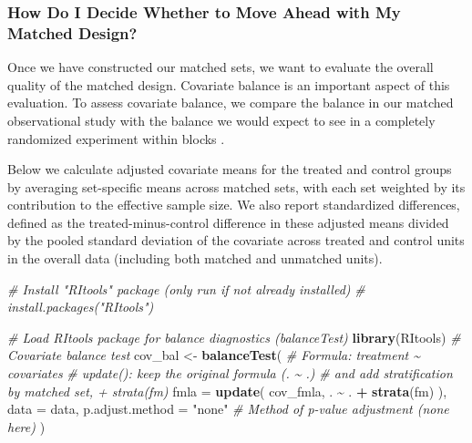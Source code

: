 \documentclass[
  12pt,
  leqno]{article}
\newenvironment{Shaded}{\begin{snugshade}}{\end{snugshade}}
\newcommand{\AttributeTok}[1]{\textcolor[rgb]{0.13,0.29,0.53}{#1}}
\newcommand{\CommentTok}[1]{\textcolor[rgb]{0.56,0.35,0.01}{\textit{#1}}}
\newcommand{\FunctionTok}[1]{\textcolor[rgb]{0.13,0.29,0.53}{\textbf{#1}}}
\newcommand{\NormalTok}[1]{#1}
\newcommand{\OtherTok}[1]{\textcolor[rgb]{0.56,0.35,0.01}{#1}}
\newcommand{\SpecialCharTok}[1]{\textcolor[rgb]{0.81,0.36,0.00}{\textbf{#1}}}
\newcommand{\StringTok}[1]{\textcolor[rgb]{0.31,0.60,0.02}{#1}}
\begin{document}
\subsubsection{How Do I Decide Whether to Move Ahead with My Matched
Design?}\label{how-do-i-decide-whether-to-move-ahead-with-my-matched-design}

Once we have constructed our matched sets, we want to evaluate the
overall quality of the matched design. Covariate balance is an important
aspect of this evaluation. To assess covariate balance, we compare the
balance in our matched observational study with the balance we would
expect to see in a completely randomized experiment within blocks
\citep{hansenbowers2008}.

Below we calculate adjusted covariate means for the treated and control
groups by averaging set-specific means across matched sets, with each
set weighted by its contribution to the effective sample size. We also
report standardized differences, defined as the treated-minus-control
difference in these adjusted means divided by the pooled standard
deviation of the covariate across treated and control units in the
overall data (including both matched and unmatched units).

\singlespacing

\begin{Shaded}
\begin{Highlighting}[]
\CommentTok{\# Install "RItools" package (only run if not already installed)}
\CommentTok{\# install.packages("RItools")}

\CommentTok{\# Load RItools package for balance diagnostics (balanceTest)}
\FunctionTok{library}\NormalTok{(RItools)}
\CommentTok{\# Covariate balance test}
\NormalTok{cov\_bal }\OtherTok{\textless{}{-}} \FunctionTok{balanceTest}\NormalTok{(}
  \CommentTok{\# Formula: treatment \textasciitilde{} covariates}
  \CommentTok{\# update(): keep the original formula (. \textasciitilde{} .)}
  \CommentTok{\# and add stratification by matched set, + strata(fm)}
  \AttributeTok{fmla =} \FunctionTok{update}\NormalTok{(}
\NormalTok{    cov\_fmla, . }\SpecialCharTok{\textasciitilde{}}\NormalTok{ . }\SpecialCharTok{+} \FunctionTok{strata}\NormalTok{(fm)}
\NormalTok{  ),}
  \AttributeTok{data =}\NormalTok{ data,}
  \AttributeTok{p.adjust.method =} \StringTok{"none"} \CommentTok{\# Method of p{-}value adjustment (none here)}
\NormalTok{)}
\end{Highlighting}
\end{Shaded}
\end{document}
